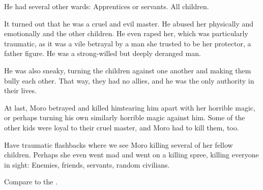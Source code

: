 He had several other wards: 
Apprentices or servants. All children.

It turned out that he was a cruel and evil master. 
He abused her physically and emotionally and the other children. 
He even raped her, which was particularly traumatic, as it was a vile betrayal by a man she trusted to be her protector, a father figure. 
He was a strong-willed but deeply deranged man. 

He was also sneaky, turning the children against one another and making them bully each other. 
That way, they had no allies, and he was the only authority in their lives.

At last, Moro betrayed and killed him\dash tearing him apart with her horrible magic, or perhaps turning his own similarly horrible magic against him. 
Some of the other kids were loyal to their cruel master, and Moro had to kill them, too. 

Have traumatic flashbacks where we see Moro killing several of her fellow children. 
Perhaps she even went mad and went on a killing spree, killing everyone in sight: 
Enemies, friends, servants, random civilians. 

Compare to the \cite{Anime:ElfenLied}.






